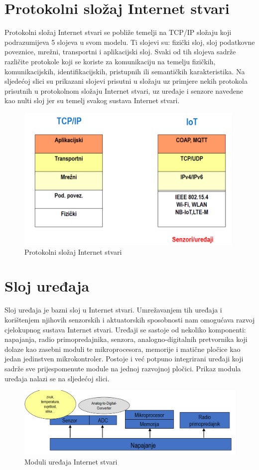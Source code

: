 \documentclass[times, utf8, diplomski]{fer}
\begin{document}
\section{Protokolni složaj Internet stvari}
Protokolni složaj Internet stvari se pobliže temelji na TCP/IP složaju koji podrazumijeva 5 slojeva u svom modelu. Ti slojevi su: fizički sloj, sloj podatkovne poveznice, mrežni, transportni i aplikacijski sloj. Svaki od tih slojeva sadrže različite protokole koji se koriste za komunikaciju na temelju fizičkih, komunikacijskih, identifikacijskih, pristupnih ili semantičkih karakteristika. Na sljedećoj slici su prikazani slojevi prisutni u složaju uz primjere nekih protokola prisutnih u protokolnom složaju Internet stvari, uz uređaje i senzore navedene kao nulti sloj jer su temelj svakog sustava Internet stvari. %
\begin{figure}[htb]
    \centering
    \includegraphics[width=11cm]{images/iot-stack.png}
    \caption{Protokolni složaj Internet stvari\citep{InternetStvari}}
    \label{fig:iotstack}
\end{figure}

\section{Sloj uređaja}
Sloj uređaja je bazni sloj u Internet stvari. Umrežavanjem tih uređaja i korištenjem njihovih senzorskih i aktuatorskih sposobnosti nam omogućava razvoj cjelokupnog sustava Internet stvari. Uređaji se sastoje od nekoliko komponenti: napajanja, radio primopredajnika, senzora, analogno-digitalnih pretvornika koji dolaze kao zasebni moduli te mikroprocesora, memorije i matične pločice kao jedan jedinstven mikrokontroler. Postoje i već potpuno integrirani uređaji koji sadrže sve prijespomenute module na jednoj razvojnoj pločici. Prikaz modula uređaja nalazi se na sljedećoj slici.
\begin{figure}[htb]
    \centering
    \includegraphics[width=14cm]{images/devicemodule.png}
    \caption{Moduli uređaja Internet stvari\citep{InternetStvari}}
    \label{fig:devicemodule}
\end{figure}
\end{document}

